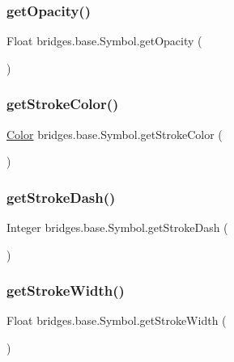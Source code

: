 \subsubsection{\texorpdfstring{getOpacity()}{getOpacity()}}
{\footnotesize\ttfamily Float bridges.\+base.\+Symbol.\+get\+Opacity (\begin{DoxyParamCaption}{ }\end{DoxyParamCaption})}

\mbox{\label{classbridges_1_1base_1_1_symbol_abd38aaea2fc344adcc8096ed6eb8681c}} 
\subsubsection{\texorpdfstring{getStrokeColor()}{getStrokeColor()}}
{\footnotesize\ttfamily \mbox{\hyperlink{classbridges_1_1base_1_1_color}{Color}} bridges.\+base.\+Symbol.\+get\+Stroke\+Color (\begin{DoxyParamCaption}{ }\end{DoxyParamCaption})}

\mbox{\label{classbridges_1_1base_1_1_symbol_a31ff460ae6b24ed968c1045e2533a967}} 
\subsubsection{\texorpdfstring{getStrokeDash()}{getStrokeDash()}}
{\footnotesize\ttfamily Integer bridges.\+base.\+Symbol.\+get\+Stroke\+Dash (\begin{DoxyParamCaption}{ }\end{DoxyParamCaption})}

\mbox{\label{classbridges_1_1base_1_1_symbol_aa9f4b8ed61cfd3a30dc979d53526ab4e}} 
\subsubsection{\texorpdfstring{getStrokeWidth()}{getStrokeWidth()}}
{\footnotesize\ttfamily Float bridges.\+base.\+Symbol.\+get\+Stroke\+Width (\begin{DoxyParamCaption}{ }\end{DoxyParamCaption})}

